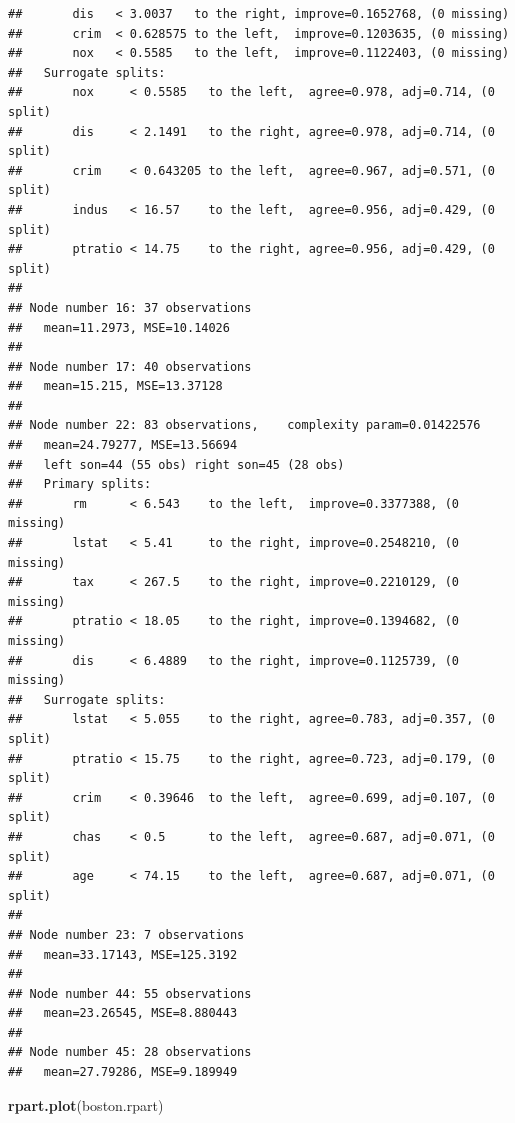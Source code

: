 \documentclass[
]{book}
\newenvironment{Shaded}{\begin{snugshade}}{\end{snugshade}}
\newcommand{\KeywordTok}[1]{\textcolor[rgb]{0.13,0.29,0.53}{\textbf{#1}}}
\newcommand{\NormalTok}[1]{#1}
\theoremstyle{plain}
\theoremstyle{definition}
\theoremstyle{definition}
\theoremstyle{definition}
\theoremstyle{definition}
\theoremstyle{remark}
\begin{document}
\begin{verbatim}
##       dis   < 3.0037   to the right, improve=0.1652768, (0 missing)
##       crim  < 0.628575 to the left,  improve=0.1203635, (0 missing)
##       nox   < 0.5585   to the left,  improve=0.1122403, (0 missing)
##   Surrogate splits:
##       nox     < 0.5585   to the left,  agree=0.978, adj=0.714, (0 split)
##       dis     < 2.1491   to the right, agree=0.978, adj=0.714, (0 split)
##       crim    < 0.643205 to the left,  agree=0.967, adj=0.571, (0 split)
##       indus   < 16.57    to the left,  agree=0.956, adj=0.429, (0 split)
##       ptratio < 14.75    to the right, agree=0.956, adj=0.429, (0 split)
## 
## Node number 16: 37 observations
##   mean=11.2973, MSE=10.14026 
## 
## Node number 17: 40 observations
##   mean=15.215, MSE=13.37128 
## 
## Node number 22: 83 observations,    complexity param=0.01422576
##   mean=24.79277, MSE=13.56694 
##   left son=44 (55 obs) right son=45 (28 obs)
##   Primary splits:
##       rm      < 6.543    to the left,  improve=0.3377388, (0 missing)
##       lstat   < 5.41     to the right, improve=0.2548210, (0 missing)
##       tax     < 267.5    to the right, improve=0.2210129, (0 missing)
##       ptratio < 18.05    to the right, improve=0.1394682, (0 missing)
##       dis     < 6.4889   to the right, improve=0.1125739, (0 missing)
##   Surrogate splits:
##       lstat   < 5.055    to the right, agree=0.783, adj=0.357, (0 split)
##       ptratio < 15.75    to the right, agree=0.723, adj=0.179, (0 split)
##       crim    < 0.39646  to the left,  agree=0.699, adj=0.107, (0 split)
##       chas    < 0.5      to the left,  agree=0.687, adj=0.071, (0 split)
##       age     < 74.15    to the left,  agree=0.687, adj=0.071, (0 split)
## 
## Node number 23: 7 observations
##   mean=33.17143, MSE=125.3192 
## 
## Node number 44: 55 observations
##   mean=23.26545, MSE=8.880443 
## 
## Node number 45: 28 observations
##   mean=27.79286, MSE=9.189949
\end{verbatim}

\begin{Shaded}
\begin{Highlighting}[]
\KeywordTok{rpart.plot}\NormalTok{(boston.rpart)}
\end{Highlighting}
\end{Shaded}
\end{document}
